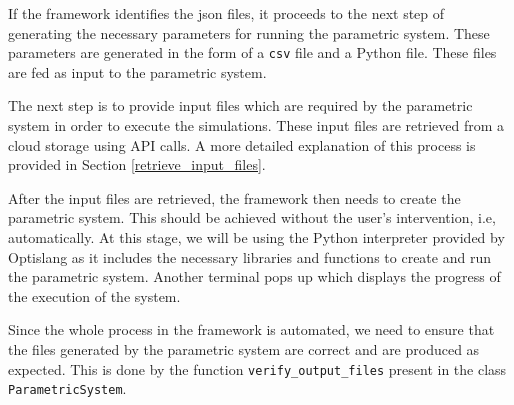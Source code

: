 If the framework identifies the \acrshort{json} files, it proceeds to the next step of generating the necessary parameters for running the parametric system. 
These parameters are generated in the form of a \texttt{csv} file and a Python file. These files are fed as input to the parametric system. 

The next step is to provide input files which are required by the parametric system in order to execute the simulations. These input files are retrieved from 
a cloud storage using API calls. A more detailed explanation of this process is provided in Section \ref{retrieve_input_files}. 

After the input files are retrieved, the framework then needs to create the parametric system. This should be achieved without the user's intervention, i.e, 
automatically. At this stage, we will be using the Python interpreter provided by Optislang as it includes the necessary libraries and functions to create and run 
the parametric system. Another terminal pops up which displays the progress of the execution of the system.

Since the whole process in the framework is automated, we need to ensure that the files generated by the parametric system are correct and are produced as 
expected. This is done by the function \texttt{verify\_output\_files} present in the class \texttt{ParametricSystem}. 


